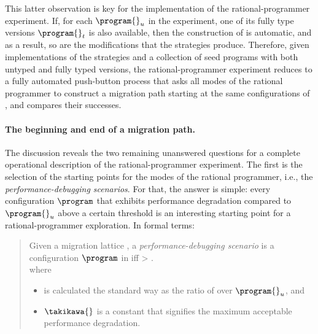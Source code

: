 This latter observation is key for the implementation of the
rational-programmer experiment. If, for each  $\program{}_u$ in the
experiment, one of its fully type versions $\program{}_t$ is also
available, then the construction of  is
automatic, and as a result, so are the modifications that the strategies 
produce. Therefore, given implementations of the strategies and a
collection of seed programs with both untyped and fully typed versions,
the rational-programmer experiment reduces to a fully automated push-button 
process that asks all modes of the rational programmer to
construct a migration path starting at the same configurations of   
, and compares their successes. 

\paragraph{The beginning and end of a migration path.}
The discussion reveals the two remaining unanswered questions for a complete
operational description of the rational-programmer experiment. The first
 is the selection of the starting points for the modes of the rational
programmer, i.e., the \emph{performance-debugging scenarios}. 
For that, the answer is simple: 
every configuration $\program$ that exhibits performance degradation compared to 
$\program{}_u$ above a certain threshold is an interesting starting point
for a rational-programmer exploration. In formal terms: 

\begin{quote} \em

Given a migration lattice ,
a \emph{performance-debugging scenario} is a configuration $\program$ in  
iff
 > \takikawa{}.\\
 where 
  \begin{itemize}
   \item \slowdownkw{} is calculated the standard way as the ratio of \program{} over $\program{}_u$, and
   \item $\takikawa{}$ is a constant that signifies the maximum acceptable performance degradation.
  \end{itemize}
\end{quote}

